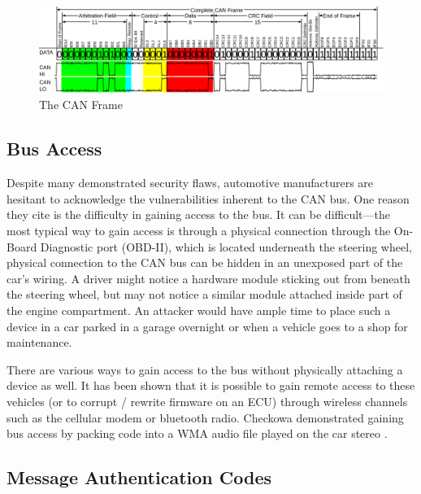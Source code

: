 	\begin{figure}
		\centering
		\includegraphics[width=\linewidth]{figures/can_frame.png}
		\caption{The CAN Frame}
	\end{figure}

\subsection{Bus Access}

Despite many demonstrated security flaws, automotive manufacturers are hesitant to acknowledge the vulnerabilities inherent to the CAN bus. One reason they cite is the difficulty in gaining access to the bus. It can be difficult---the most typical way to gain access is through a physical connection through the On-Board Diagnostic port (OBD-II), which is located underneath the steering wheel, physical connection to the CAN bus can be hidden in an unexposed part of the car's wiring. A driver might notice a hardware module sticking out from beneath the steering wheel, but may not notice a similar module attached inside part of the engine compartment. An attacker would have ample time to place such a device in a car parked in a garage overnight or when a vehicle goes to a shop for maintenance.

There are various ways to gain access to the bus without physically attaching a device as well. It has been shown that it is possible to gain remote access to these vehicles (or to corrupt / rewrite firmware on an ECU) through wireless channels such as the cellular modem or bluetooth radio. Checkowa demonstrated gaining bus access by packing code into a WMA audio file played on the car stereo \cite{Checkoway-2011}. 

\subsection{Message Authentication Codes}

